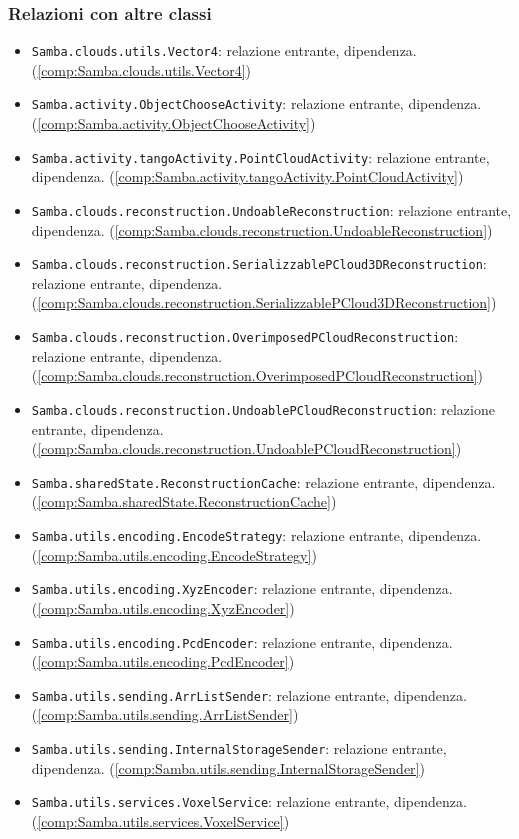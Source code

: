 \subsubsection{Relazioni con altre classi}
\begin{itemize}
	\item \texttt{Samba.clouds.utils.Vector4}: relazione entrante, dipendenza. (\ref{comp:Samba.clouds.utils.Vector4})
	\item \texttt{Samba.activity.ObjectChooseActivity}: relazione entrante, dipendenza. (\ref{comp:Samba.activity.ObjectChooseActivity})
	\item \texttt{Samba.activity.tangoActivity.PointCloudActivity}:	relazione entrante, dipendenza. (\ref{comp:Samba.activity.tangoActivity.PointCloudActivity})
	\item \texttt{Samba.clouds.reconstruction.UndoableReconstruction}: relazione entrante, dipendenza. (\ref{comp:Samba.clouds.reconstruction.UndoableReconstruction})
	\item \texttt{Samba.clouds.reconstruction.SerializzablePCloud3DReconstruction}: relazione entrante, dipendenza. (\ref{comp:Samba.clouds.reconstruction.SerializzablePCloud3DReconstruction})
	\item \texttt{Samba.clouds.reconstruction.OverimposedPCloudReconstruction}: relazione entrante, dipendenza. (\ref{comp:Samba.clouds.reconstruction.OverimposedPCloudReconstruction})
	\item \texttt{Samba.clouds.reconstruction.UndoablePCloudReconstruction}: relazione entrante, dipendenza. (\ref{comp:Samba.clouds.reconstruction.UndoablePCloudReconstruction})
	\item \texttt{Samba.sharedState.ReconstructionCache}: relazione entrante, dipendenza. (\ref{comp:Samba.sharedState.ReconstructionCache})
	\item \texttt{Samba.utils.encoding.EncodeStrategy}: relazione entrante, dipendenza. (\ref{comp:Samba.utils.encoding.EncodeStrategy})
	\item \texttt{Samba.utils.encoding.XyzEncoder}: relazione entrante, dipendenza. (\ref{comp:Samba.utils.encoding.XyzEncoder})
	\item \texttt{Samba.utils.encoding.PcdEncoder}: relazione entrante, dipendenza. (\ref{comp:Samba.utils.encoding.PcdEncoder})
	\item \texttt{Samba.utils.sending.ArrListSender}: relazione entrante, dipendenza. (\ref{comp:Samba.utils.sending.ArrListSender})
	\item \texttt{Samba.utils.sending.InternalStorageSender}: relazione entrante, dipendenza. (\ref{comp:Samba.utils.sending.InternalStorageSender})
	\item \texttt{Samba.utils.services.VoxelService}: relazione entrante, dipendenza. (\ref{comp:Samba.utils.services.VoxelService})
\end{itemize}
